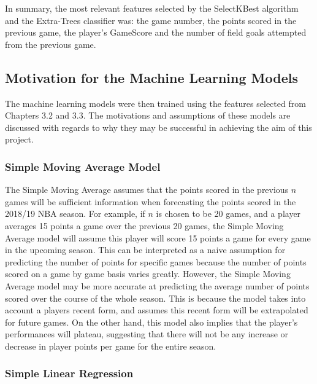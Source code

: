 \documentclass[a4paper,11pt,twoside]{article}
\begin{document}
In summary, the most relevant features selected by the SelectKBest algorithm and the Extra-Trees classifier was: the game number, the points scored in the previous game, the player's GameScore and the number of field goals attempted from the previous game. 

\subsection{Motivation for the Machine Learning Models} 

The machine learning models were then trained using the features selected from Chapters 3.2 and 3.3. The motivations and assumptions of these models are discussed with regards to why they may be successful in achieving the aim of this project.

\subsubsection{Simple Moving Average Model}

The Simple Moving Average assumes that the points scored in the previous $n$ games will be sufficient information when forecasting the points scored in the 2018/19 NBA season. For example, if $n$ is chosen to be 20 games, and a player averages 15 points a game over the previous 20 games, the Simple Moving Average model will assume this player will score 15 points a game for every game in the upcoming season. This can be interpreted as a naive assumption for predicting the number of points for specific games because the number of points scored on a game by game basis varies greatly. However, the Simple Moving Average model may be more accurate at predicting the average number of points scored over the course of the whole season. This is because the model takes into account a players recent form, and assumes this recent form will be extrapolated for future games. On the other hand, this model also implies that the player's performances will plateau, suggesting that there will not be any increase or decrease in player points per game for the entire season. 


\subsubsection{Simple Linear Regression}
\end{document}

